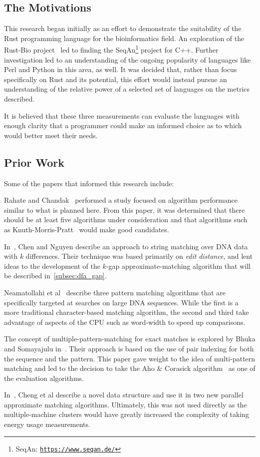 \subsection{The Motivations}

This research began initially as an effort to demonstrate the suitability of the Rust programming language for the bioinformatics field. An exploration of the Rust-Bio project~\cite{rust} led to finding the SeqAn\footnote{SeqAn: \texttt{\url{https://www.seqan.de/}}} project for C++. Further investigation led to an understanding of the ongoing popularity of languages like Perl and Python in this area, as well. It was decided that, rather than focus specifically on Rust and its potential, this effort would instead pursue an understanding of the relative power of a selected set of languages on the metrics described.

It is believed that these three measurements can evaluate the languages with enough clarity that a programmer could make an informed choice as to which would better meet their needs.

\subsection{Prior Work}

Some of the papers that informed this research include:

Rahate and Chandak~\cite{rahate} performed a study focused on algorithm performance similar to what is planned here. From this paper, it was determined that there should be at least five algorithms under consideration and that algorithms such as Knuth-Morris-Pratt~\cite{knuth} would make good candidates.

In~\cite{chen2021string}, Chen and Nguyen describe an approach to string matching over DNA data with $k$ differences. Their technique was based primarily on \textit{edit distance}, and lent ideas to the development of the $k$-gap approximate-matching algorithm that will be described in~\ref{subsec:dfa_gap}.

Neamatollahi et al~\cite{neamatollahi} describe three pattern matching algorithms that are specifically targeted at searches on large DNA sequences. While the first is a more traditional character-based matching algorithm, the second and third take advantage of aspects of the CPU such as word-width to speed up comparisons.

The concept of multiple-pattern-matching for exact matches is explored by Bhuka and Somayajulu in~\cite{bhukya}. Their approach is based on the use of pair indexing for both the sequence and the pattern. This paper gave weight to the idea of multi-pattern matching and led to the decision to take the Aho \& Corasick algorithm~\cite{aho} as one of the evaluation algorithms.

In~\cite{cheng2003approximate}, Cheng et al describe a novel data structure and use it in two new parallel approximate matching algorithms. Ultimately, this was not used directly as the multiple-machine clusters would have greatly increased the complexity of taking energy usage measurements.
